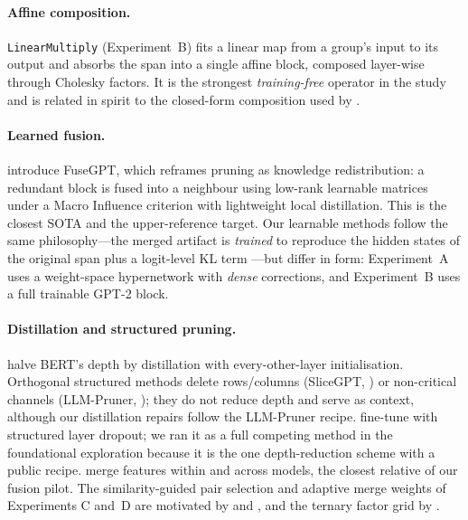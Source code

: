 \documentclass[10pt,a4paper]{article}
\newcommand{\linop}{\texttt{LinearMultiply}}
\begin{document}
\paragraph{Affine composition.} \linop{} (Experiment~B) fits a linear map from a
group's input to its output and absorbs the span into a single affine block,
composed layer-wise through Cholesky factors. It is the strongest
\emph{training-free} operator in the study and is related in spirit to the
closed-form composition used by \citet{yang2024laco}.

\paragraph{Learned fusion.} \citet{pei2024fusegpt} introduce FuseGPT, which
reframes pruning as knowledge redistribution: a redundant block is fused into a
neighbour using low-rank learnable matrices under a Macro Influence criterion
with lightweight local distillation. This is the closest SOTA and the
upper-reference target. Our learnable methods follow the same philosophy---the
merged artifact is \emph{trained} to reproduce the hidden states of the original
span plus a logit-level KL term \citep{hinton2015distilling}---but differ in
form: Experiment~A uses a weight-space hypernetwork with \emph{dense}
corrections, and Experiment~B uses a full trainable GPT-2 block.

\paragraph{Distillation and structured pruning.} \citet{sanh2019distilbert}
halve BERT's depth by distillation with every-other-layer initialisation.
Orthogonal structured methods delete rows/columns (SliceGPT,
\citealt{ashkboos2024slicegpt}) or non-critical channels (LLM-Pruner,
\citealt{ma2023llmpruner}); they do not reduce depth and serve as context,
although our distillation repairs follow the LLM-Pruner recipe.
\citet{fan2020layerdrop} fine-tune with structured layer dropout; we ran it as a
full competing method in the foundational exploration because it is the one
depth-reduction scheme with a public recipe. \citet{stoica2024zipit} merge
features within and across models, the closest relative of our fusion pilot.
The similarity-guided pair selection and adaptive merge weights of Experiments
C and~D are motivated by \citet{zhang2025com} and \citet{liu2024mka}, and the
ternary factor grid by \citet{ma2024bitnet}.
\end{document}
